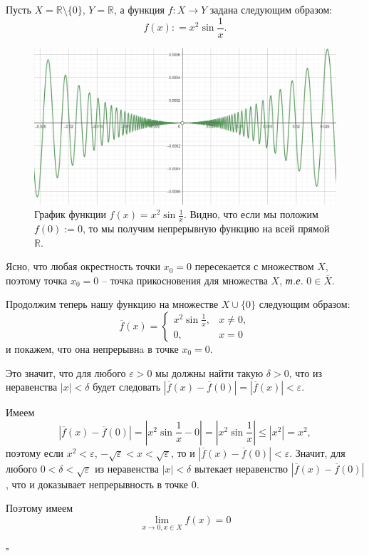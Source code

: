 \begin{example}
Пусть $X = \mathbb{R}\setminus\{0\}$, $Y = \mathbb{R}$, а функция $f:X\to Y$ задана следующим образом:
\[
 f(x): = x^2 \sin \frac{1}{x}.
\]

\begin{figure}[h!]
    \centering
    \includegraphics[width=1\linewidth]{images/x2sin.jpg}
    \caption{График функции $f(x) = x^2 \sin \frac{1}{x}$. Видно, что если мы положим $f(0):=0$, то мы получим непрерывную функцию на всей прямой $\mathbb{R}$.}
\end{figure}


Ясно, что любая окрестность точки $x_0=0$ пересекается с множеством $X$, поэтому точка $x_0 = 0$ -- точка прикосновения для множества $X$, \textit{т.е.} $0 \in \overline{X}$.

Продолжим теперь нашу функцию на множестве $X\cup \{0\}$ следующим образом:
    \[
    \overline{f}(x) = \begin{cases}
         x^2 \sin \frac{1}{x}, & x \ne 0, \\
         0, & x =0
     \end{cases}
    \]
и покажем, что она непрерывнa в точке $x_0 =0$.

Это значит, что для любого $\varepsilon >0$ мы должны найти такую $\delta >0$, что из неравенства $|x|<\delta$ будет следовать $|\overline{f}(x) -\overline{f}(0)| = |\overline{f}(x)| <\varepsilon.$

Имеем 
    \[
    \left|\overline{f}(x) -\overline{f}(0)\right| = \left|x^2 \sin \frac{1}{x} - 0 \right| = \left|x^2 \sin \frac{1}{x}\right| \le |x^2| = x^2,
    \]
поэтому если $x^2 <\varepsilon$, \ie $-\sqrt{ \varepsilon} <x < \sqrt{\varepsilon}$, то и $|\overline{f}(x) - \overline{f}(0)| <\varepsilon$. Значит, для любого $0 < \delta < \sqrt{\varepsilon}$ из неравенства $|x|<\delta$ вытекает неравенство $|\overline{f}(x) - \overline{f}(0)|$, что и доказывает непрерывность в точке $0.$ 

Поэтому имеем
\[
\lim_{x \to 0, x \in X}f(x) = 0  
\]
\begin{flushright}
    $\square$
\end{flushright}
\end{example}


